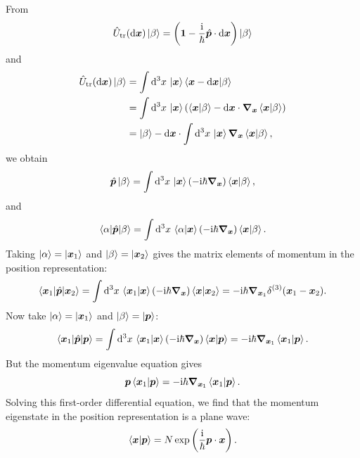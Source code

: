From
\begin{equation}
\hat{U}_{\mathrm{tr}}(\mathrm{d}\bm{x})\left|\beta\right\rangle
=\left(\mathbf1-\frac{\mathrm{i}}\hbar\hat{\bm{p}}\cdot\mathrm{d}\bm{x}\right)\left|\beta\right\rangle
\end{equation}
and
\begin{equation}\begin{aligned}
\hat{U}_{\mathrm{tr}}(\mathrm{d}\bm{x})\left|\beta\right\rangle
&=\int\mathrm{d}^3x\,\left|\bm{x}\right\rangle\left\langle\bm{x}-\mathrm{d}\bm{x}\middle|\beta\right\rangle\\
&=\int\mathrm{d}^3x\,\left|\bm{x}\right\rangle\left(
\left\langle\bm{x}\middle|\beta\right\rangle-\mathrm{d}\bm{x}\cdot\bm{\nabla}_{\bm{x}}\left\langle\bm{x}\middle|\beta\right\rangle
\right)\\
&=\left|\beta\right\rangle-\mathrm{d}\bm{x}\cdot\int\mathrm{d}^3x\,\left|\bm{x}\right\rangle\bm{\nabla}_{\bm{x}}\left\langle\bm{x}\middle|\beta\right\rangle,
\end{aligned}\end{equation}
we obtain
\begin{equation}
\hat{\bm{p}}\left|\beta\right\rangle
=\int\mathrm{d}^3x\,\left|\bm{x}\right\rangle(-\mathrm{i}\hbar\bm{\nabla}_{\bm{x}})\left\langle\bm{x}\middle|\beta\right\rangle,
\end{equation}
and
\begin{equation}
\left\langle\alpha\middle|\hat{\bm{p}}\middle|\beta\right\rangle
=\int\mathrm{d}^3x\,\left\langle\alpha\middle|\bm{x}\right\rangle(-\mathrm{i}\hbar\bm{\nabla}_{\bm{x}})\left\langle\bm{x}\middle|\beta\right\rangle.
\end{equation}
Taking $\left|\alpha\right\rangle=\left|\bm{x}_1\right\rangle$ and $\left|\beta\right\rangle=\left|\bm{x}_2\right\rangle$ gives the matrix elements of momentum in the position representation:
\begin{equation}
\left\langle\bm{x}_1\middle|\hat{\bm{p}}\middle|\bm{x}_2\right\rangle
=\int\mathrm{d}^3x\,\left\langle\bm{x}_1\middle|\bm{x}\right\rangle(-\mathrm{i}\hbar\bm{\nabla}_{\bm{x}})\left\langle\bm{x}\middle|\bm{x}_2\right\rangle
=-\mathrm{i}\hbar\bm{\nabla}_{\bm{x}_1}\delta^{(3)}(\bm{x}_1-\bm{x}_2).
\end{equation}
Now take $\left|\alpha\right\rangle=\left|\bm{x}_1\right\rangle$ and $\left|\beta\right\rangle=\left|\bm{p}\right\rangle$:
\begin{equation}
\left\langle\bm{x}_1\middle|\hat{\bm{p}}\middle|\bm{p}\right\rangle
=\int\mathrm{d}^3x\,\left\langle\bm{x}_1\middle|\bm{x}\right\rangle(-\mathrm{i}\hbar\bm{\nabla}_{\bm{x}})\left\langle\bm{x}\middle|\bm{p}\right\rangle
=-\mathrm{i}\hbar\bm{\nabla}_{\bm{x}_1}\left\langle\bm{x}_1\middle|\bm{p}\right\rangle.
\end{equation}
But the momentum eigenvalue equation gives
\begin{equation}
\bm{p}\left\langle\bm{x}_1\middle|\bm{p}\right\rangle
=-\mathrm{i}\hbar\bm{\nabla}_{\bm{x}_1}\left\langle\bm{x}_1\middle|\bm{p}\right\rangle.
\end{equation}
Solving this first-order differential equation, we find that the momentum eigenstate in the position representation is a plane wave:
\begin{equation}
\left\langle\bm{x}\middle|\bm{p}\right\rangle=N\exp\left(\frac{\mathrm{i}}\hbar\bm{p}\cdot\bm{x}\right).
\end{equation}
